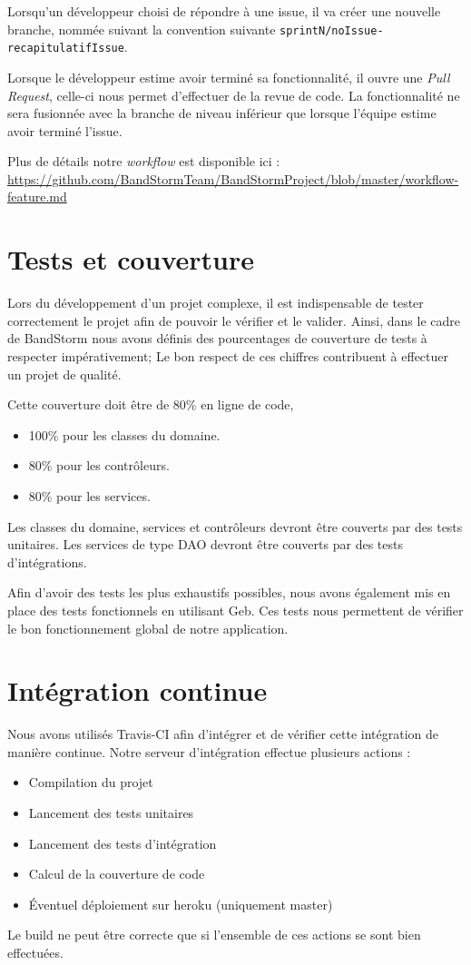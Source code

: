 \documentclass[12pt,a4paper,oneside]{book}
\begin{document}
	Lorsqu'un développeur choisi de répondre à une issue, il va créer une nouvelle branche, nommée suivant la convention suivante
	\texttt{sprintN/noIssue-recapitulatifIssue}.
	
	Lorsque le développeur estime avoir terminé sa fonctionnalité, il ouvre une \textit{Pull Request}, celle-ci nous permet d'effectuer de la revue de code. La fonctionnalité ne sera fusionnée avec la branche de niveau inférieur que lorsque l'équipe estime avoir terminé l'issue.
	
	Plus de détails notre \textit{workflow} est disponible ici : 
	\url{https://github.com/BandStormTeam/BandStormProject/blob/master/workflow-feature.md}
	
	\section{Tests et couverture}
	Lors du développement d'un projet complexe, il est indispensable de tester correctement le projet afin de pouvoir le vérifier et le valider. Ainsi, dans le cadre de BandStorm nous avons définis des pourcentages de couverture de tests à respecter impérativement; Le bon respect de ces chiffres contribuent à effectuer un projet de qualité. 
	
	Cette couverture doit être de 80\% en ligne de code, 
	\begin{itemize}
		\item 100\% pour les classes du domaine.
		\item 80\% pour les contrôleurs.
		\item 80\% pour les services.
	\end{itemize}	
	
	Les classes du domaine, services et contrôleurs devront être couverts par des tests unitaires. Les services de type DAO devront être couverts par des tests d'intégrations.
	
	Afin d’avoir des tests les plus exhaustifs possibles, nous avons également mis en place des tests fonctionnels en utilisant Geb. Ces tests nous permettent de vérifier le bon fonctionnement global de notre application.
	
	\section{Intégration continue}
	Nous avons utilisés Travis-CI afin d’intégrer et de vérifier cette intégration de manière continue. Notre serveur d’intégration effectue plusieurs actions : 
	\begin{itemize}
		\item Compilation du projet 
		\item Lancement des tests unitaires
		\item Lancement des tests d’intégration
		\item Calcul de la couverture de code
		\item Éventuel déploiement sur heroku (uniquement master)
	\end{itemize}
	Le build ne peut être correcte que si l'ensemble de ces actions se sont bien effectuées. 
\end{document}
